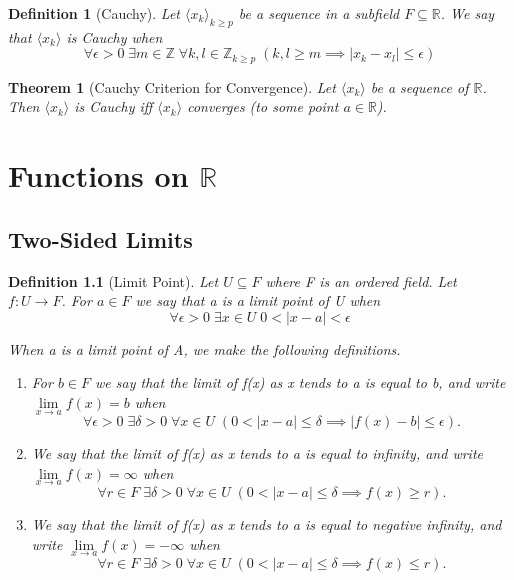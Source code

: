 \documentclass[11pt, oneside]{book}
\theoremstyle{break}
\newtheorem{thm}{Theorem}[section]
\newtheorem{defn}{Definition}[section]
\newcommand{\bb}[1]{\mathbb{#1}}			%
\begin{document}
\begin{defn}[Cauchy]
	Let $\langle x_k \rangle_{k \geq p}$ be a sequence in a subfield $F \subseteq \bb{R}$. We say that $\langle x_k \rangle$ is Cauchy when
	\[
		\forall \epsilon > 0 \; \exists m \in \bb{Z} \; \forall k, l \in \bb{Z}_{k \geq p}\; (k, l \geq m \implies |x_k - x_l| \leq \epsilon)
	\]
\end{defn}

\begin{thm}[Cauchy Criterion for Convergence]\label{CauchyCriterion_Seq}
	Let $\langle x_k \rangle$ be a sequence of $\bb{R}$. Then $\langle x_k \rangle$ is Cauchy iff $\langle x_k \rangle$ converges (to some point $a \in \bb{R}$).
\end{thm}


\chapter{Functions on \texorpdfstring{$\bb{R}$}{R}}


\section{Two-Sided Limits}

\begin{defn}[Limit Point]
	Let $U \subseteq F$ where F is an ordered field. Let $f: U \to F$. For $a \in F$ we say that a is a limit point of U when
	\[
		\forall \epsilon > 0 \; \exists x \in U \; 0 < |x - a| < \epsilon
	\]

	When a is a limit point of A, we make the following definitions.
	\begin{enumerate}
		\item For $b \in F$ we say that the limit of f(x) as x tends to a is equal to b, and write $\lim\limits_{x \to a} f(x) = b$ when
			\[
				\forall \epsilon > 0 \; \exists \delta > 0 \; \forall x \in U \; (0 < |x - a| \leq \delta \implies |f(x) - b| \leq \epsilon).
			\]
		\item We say that the limit of f(x) as x tends to a is equal to infinity, and write $\lim\limits_{x \to a} f(x) = \infty$ when
			\[
				\forall r \in F \; \exists \delta > 0 \; \forall x \in U \; (0 < |x - a| \leq \delta \implies f(x) \geq r).
			\]
		\item We say that the limit of f(x) as x tends to a is equal to negative infinity, and write $\lim\limits_{x \to a}f(x) = -\infty$ when
			\[
				\forall r \in F \; \exists \delta > 0 \; \forall x \in U \; (0 < |x - a| \leq \delta \implies f(x) \leq r).
			\]
	\end{enumerate}
\end{defn}
\end{document}
